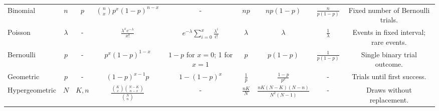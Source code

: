 \documentclass{beamer}
\begin{document}
\begin{frame}
{\begin{tabular}{lcccccccc}
            Binomial & $n$ & $p$ & ${n \choose x}p^x(1-p)^{n-x}$ & - & $np$ & $np(1-p)$ & $\frac{n}{p(1-p)}$ & Fixed number of Bernoulli trials. \\
            \rowcolor{copenhagenBlue!30} Poisson & $\lambda$ & - & $\frac{\lambda^xe^{-\lambda}}{x!}$ & $e^{-\lambda}\sum_{i=0}^{x}\frac{\lambda^i}{i!}$ & $\lambda$ & $\lambda$ & $\frac{1}{\lambda}$ & Events in fixed interval; rare events. \\
            Bernoulli & $p$ & - & $p^x(1-p)^{1-x}$ & $1-p$ for $x=0$; 1 for $x=1$ & $p$ & $p(1-p)$ & $\frac{1}{p(1-p)}$ & Single binary trial outcome. \\
            \rowcolor{copenhagenBlue!30} Geometric & $p$ & - & $(1-p)^{x-1}p$ & $1-(1-p)^x$ & $\frac{1}{p}$ & $\frac{1-p}{p^2}$ & - & Trials until first success. \\
            Hypergeometric & $N$ & $K, n$ & $\frac{{K \choose x} {N-K \choose n-x}}{{N \choose n}}$ & - & $\frac{nK}{N}$ & $\frac{nK(N-K)(N-n)}{N^2(N-1)}$ & - & Draws without replacement. \\
        \end{tabular}
    }
\end{frame}
\end{document}
